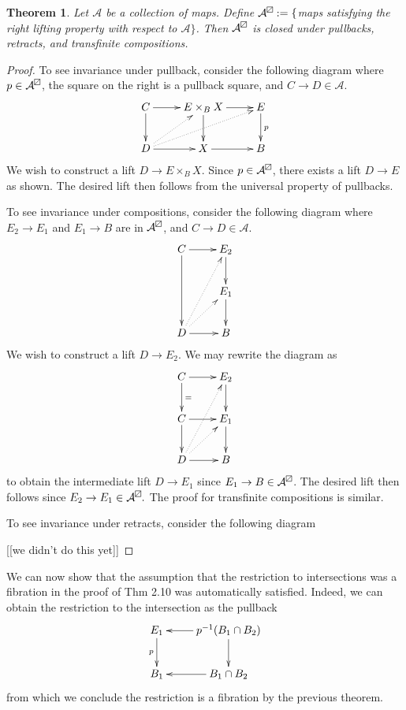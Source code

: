 \documentclass{article}
\newtheorem{theorem}{Theorem}[section]
\newtheorem{proposed work}[theorem]{Proposed Work}
\newcommand{\boxslash}{{\mathrel{
	\mathchoice{\tikz{ \draw (0,0) rectangle (6.5pt,6.5pt) -- (0,0);}} %
		{\tikz{ \draw (0,0) rectangle (6.5pt,6.5pt) -- (0,0);}} %
		{\tikz{ \draw (0,0) rectangle (5pt,5pt) -- (0,0);}} %
		{\tikz{ \draw (0,0) rectangle (5pt,5pt) -- (0,0);}} %
}}}
\newcommand{\xymat}[1]{\begin{align*}\xymatrix{ #1}\end{align*}}
\begin{document}
\begin{theorem}
Let $\mathcal{A}$ be a collection of maps. Define $\mathcal{A}^\boxslash:=\lbrace$maps satisfying the right lifting property with respect to $\mathcal{A}\rbrace$. Then $\mathcal{A}^\boxslash$ is closed under pullbacks, retracts, and transfinite compositions. 
\end{theorem}

\begin{proof}
To see invariance under pullback, consider the following diagram where $p \in \mathcal{A}^\boxslash$, the square on the right is a pullback square, and $C \to D \in \mathcal{A}$.
\xymat{
C \ar[r] \ar[d] & E\times_B X \ar[d] \ar[r] &E\ar[d]^p\\ 
D \ar[r]\ar@{.>}[ur]\ar@{.>}[urr] & X\ar[r] & B} 
We wish to construct a lift $D \to E \times_B X$. Since $p \in \mathcal{A}^\boxslash$, there exists a lift $D \to E$ as shown. The desired lift then follows from the universal property of pullbacks.

To see invariance under compositions, consider the following diagram where $E_2 \to E_1$ and $E_1 \to B$ are in $\mathcal{A}^\boxslash$, and $C \to D \in \mathcal{A}$. 
\xymat{
C \ar[r]\ar[dd] & E_2 \ar[d]\\
 & E_{1}\ar[d]\\
D \ar[r] \ar@{.>}[ur]\ar@{.>}[uur] & B\\
}
We wish to construct a lift $D \to E_2$. We may rewrite the diagram as 
\xymat{
C \ar[r]\ar[d]^= & E_2 \ar[d]\\
C \ar[r]\ar[d] & E_{1}\ar[d]\\
D \ar[r] \ar@{.>}[ur]\ar@{.>}[uur] & B\\
}
to obtain the intermediate lift $D \to E_1$ since $E_1 \to B \in \mathcal{A}^\boxslash$. The desired lift then follows since $E_2 \to E_1 \in \mathcal{A}^\boxslash.$ The proof for transfinite compositions is similar.

To see invariance under retracts, consider the following diagram

[[we didn't do this yet]]

\end{proof}

We can now show that the assumption that the restriction to intersections was a fibration in the proof of Thm 2.10 was automatically satisfied. Indeed, we can obtain the restriction to the intersection as the pullback 
\xymat{
E_1\ar[d]_p  & p^{-1}(B_1\cap B_2)\ar[d]\ar[l]\\
B_1 & B_1\cap B_2\ar[l]
}
from which we conclude the restriction is a fibration by the previous theorem.

\printbibliography
\end{document}
